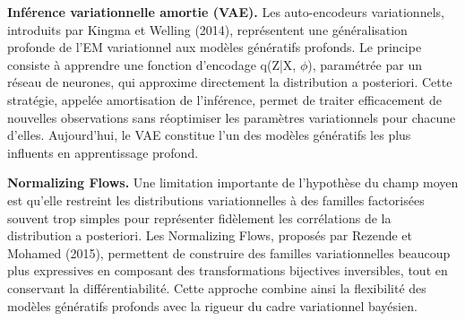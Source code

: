 \textbf{Inférence variationnelle amortie (VAE). }Les auto-encodeurs variationnels, introduits par Kingma et Welling (2014), représentent une généralisation profonde de l'EM variationnel aux modèles génératifs profonds. Le principe consiste à apprendre une fonction d'encodage q(Z|X, $\phi $), paramétrée par un réseau de neurones, qui approxime directement la distribution a posteriori. Cette stratégie, appelée amortisation de l'inférence, permet de traiter efficacement de nouvelles observations sans réoptimiser les paramètres variationnels pour chacune d'elles. Aujourd'hui, le VAE constitue l'un des modèles génératifs les plus influents en apprentissage profond.

\textbf{Normalizing Flows. }Une limitation importante de l'hypothèse du champ moyen est qu'elle restreint les distributions variationnelles à des familles factorisées souvent trop simples pour représenter fidèlement les corrélations de la distribution a posteriori. Les Normalizing Flows, proposés par Rezende et Mohamed (2015), permettent de construire des familles variationnelles beaucoup plus expressives en composant des transformations bijectives inversibles, tout en conservant la différentiabilité. Cette approche combine ainsi la flexibilité des modèles génératifs profonds avec la rigueur du cadre variationnel bayésien.

